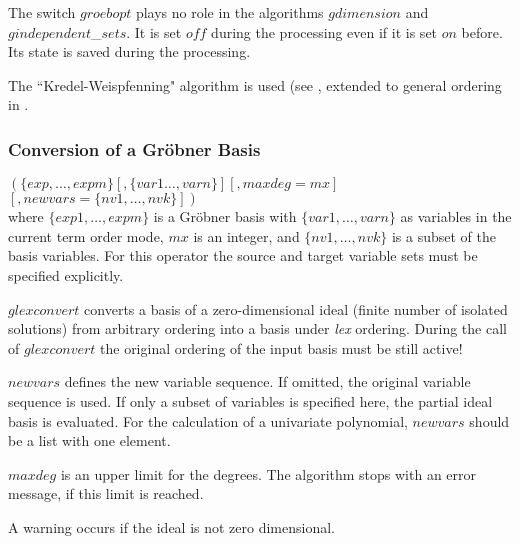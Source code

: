 The switch $groebopt$ plays no role in the algorithms $gdimension$ and
$gindependent$\_$sets$. It is set $off$ during the processing even if
it is set $on$ before. Its state is saved during the processing.

The ``Kredel-Weispfenning" algorithm is used (see \cite{Kredel:88a},
extended to general ordering in \cite{Becker:93}.

\subsubsection{Conversion of a Gr\"obner Basis}

\begin{description}
\item[{\it glexconvert}] $ \left(\{exp,\ldots , expm\} \left[,\{var1
\ldots , varn\}\right]\left[,maxdeg=mx\right]\right.$ \\
$\left.\left[,newvars=\{nv1, \ldots , nvk\}\right]\right) $ \\
where $\{exp1, \ldots , expm\}$ is a Gr\"obner basis with
$\{var1, \ldots , varn\}$ as variables in the current term order mode,
$mx$ is an integer, and
$\{nv1, \ldots , nvk\}$ is a subset of the basis variables.
For this operator the source and target variable sets must be specified
explicitly.
\end{description}

$glexconvert$ converts a basis of a zero-dimensional ideal (finite number
of isolated solutions) from arbitrary ordering into a basis under {\it
lex} ordering. During the call of $glexconvert$ the original ordering of
the input basis must be still active!

$newvars$ defines the new variable sequence. If omitted, the
original variable sequence is used. If only a subset of variables is
specified here, the partial ideal basis is evaluated. For the
calculation of a univariate polynomial, $new$\-$vars$ should be a list
with one element.

$maxdeg$ is an upper limit for the degrees. The algorithm stops with
an error message, if this limit is reached.

A warning occurs if the ideal is not zero dimensional.

